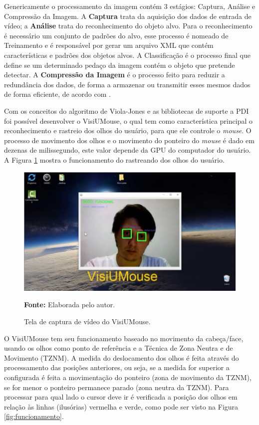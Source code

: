 Genericamente o processamento da imagem contém 3 estágios: Captura, Análise e Compressão da Imagem. A \textbf{Captura} trata da aquisição dos dados de entrada de vídeo; a \textbf{Análise} trata do reconhecimento do objeto alvo. Para o reconhecimento é necessário um conjunto de padrões do alvo, esse processo é nomeado de Treinamento e é responsável por gerar um arquivo XML que contém características e padrões dos objetos alvos. A Classificação é o processo final que define se um determinado pedaço da imagem contém o objeto que pretende detectar. A \textbf{Compressão da Imagem} é o processo feito para reduzir a redundância dos dados, de forma a armazenar ou transmitir esses mesmos dados de forma eficiente, de acordo com .

Com os conceitos do algoritmo de Viola-Jones e as bibliotecas de suporte a PDI foi possível desenvolver o VisiUMouse, o qual tem como característica principal o reconhecimento e rastreio dos olhos do usuário, para  que ele controle o \textit{mouse}. O processo de movimento dos olhos e o movimento do ponteiro do \textit{mouse} é dado em dezenas de milissegundo, este valor depende da GPU do computador do usuário. A Figura \ref{fig:visiumouse-1} mostra o funcionamento do rastreando dos olhos do usuário.

\begin{figure}[htbp]
\centering
\caption{Tela de captura de vídeo do VisiUMouse.}

\includegraphics[scale=.6]{img/visiumouse-1.png}

  \textbf{Fonte:} Elaborada pelo autor.
\label{fig:visiumouse-1}
\end{figure}

O VisiUMouse tem seu funcionamento baseado no movimento da cabeça/face, usando os olhos como ponto de referência e a Técnica de Zona Neutra e de Movimento (TZNM). A medida do deslocamento dos olhos é feita através do processamento das posições anteriores, ou seja, se a medida for superior a configurada é feita a movimentação do ponteiro (zona de movimento da TZNM), se for menor o ponteiro permanece parado (zona neutra da TZNM). Para processar para qual lado o cursor deve ir é verificada a posição dos olhos em relação às linhas (ilusórias) vermelha e verde, como pode ser visto na Figura \ref{fig:funcionamento}.

